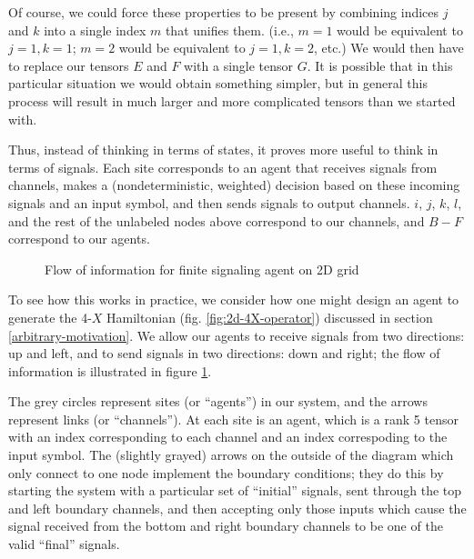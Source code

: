 \documentclass[12pt]{amsbook}
\theoremstyle{plain}
\theoremstyle{definition}
\theoremstyle{remark}
\begin{document}
Of course, we could force these properties to be present by combining indices $j$ and $k$ into a single index $m$ that unifies them.  (i.e., $m=1$ would be equivalent to $j=1, k=1$;  $m=2$ would be equivalent to $j=1,k=2$, etc.)  We would then have to replace our tensors $E$ and $F$ with a single tensor $G$.  It is possible that in this particular situation we would obtain something simpler, but in general this process will result in much larger and more complicated tensors than we started with.

Thus, instead of thinking in terms of states, it proves more useful to think in terms of signals.  Each site corresponds to an agent that receives signals from channels, makes a (nondeterministic, weighted) decision based on these incoming signals and an input symbol, and then sends signals to output channels.  $i$, $j$, $k$, $l$, and the rest of the unlabeled nodes above correspond to our channels, and $B-F$ correspond to our agents.


\begin{figure}
\caption{Flow of information for finite signaling agent on 2D grid}
\label{fig:2d-information-flow}
\end{figure}

To see how this works in practice, we consider how one might design an agent to generate the 4-$X$ Hamiltonian (fig. \ref{fig:2d-4X-operator}) discussed in section \ref{arbitrary-motivation}.  We allow our agents to receive signals from two directions: up and left, and to send signals in two directions:  down and right;  the flow of information is illustrated in figure \ref{fig:2d-information-flow}.

The grey circles represent sites (or ``agents'') in our system, and the arrows represent links (or ``channels'').  At each site is an agent, which is a rank 5 tensor with an index corresponding to each channel and an index correspoding to the input symbol.  The (slightly grayed) arrows on the outside of the diagram which only connect to one node implement the boundary conditions;  they do this by starting the system with a particular set of ``initial'' signals, sent through the top and left boundary channels, and then accepting only those inputs which cause the signal received from the bottom and right boundary channels to be one of the valid ``final'' signals.
\end{document}

